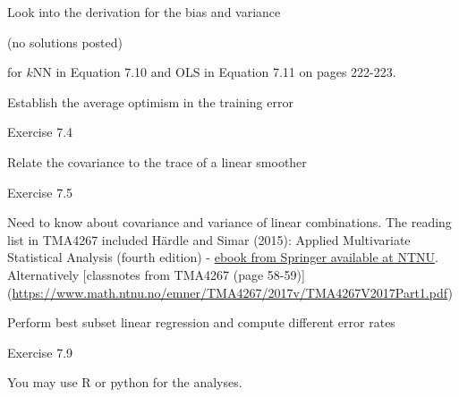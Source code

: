 \documentclass[
  ignorenonframetext,
]{beamer}
\begin{document}
\begin{frame}

\begin{block}{Look into the derivation for the bias and variance}

(no solutions posted)

for \(k\)NN in Equation 7.10 and OLS in Equation 7.11 on pages 222-223.

\end{block}

\begin{block}{Establish the average optimism in the training error}

Exercise 7.4

\end{block}

\begin{block}{Relate the covariance to the trace of a linear smoother}

Exercise 7.5

Need to know about covariance and variance of linear combinations. The
reading list in TMA4267 included Härdle and Simar (2015): Applied
Multivariate Statistical Analysis (fourth edition) -
\href{https://www.springer.com/gp/book/9783662451717}{ebook from
Springer available at NTNU}. Alternatively {[}classnotes from TMA4267
(page 58-59){]}
(\url{https://www.math.ntnu.no/emner/TMA4267/2017v/TMA4267V2017Part1.pdf})

\end{block}

\begin{block}{Perform best subset linear regression and compute
different error rates}

Exercise 7.9

You may use R or python for the analyses.

\end{block}

\end{frame}
\end{document}
